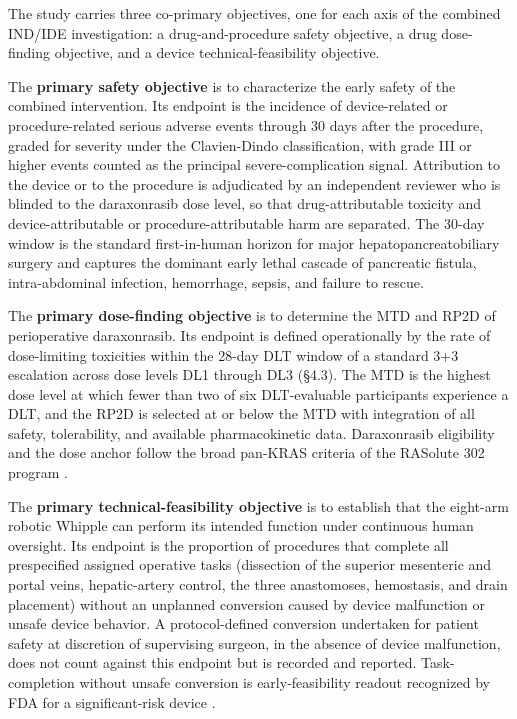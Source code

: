 The study carries three co-primary objectives, one for each axis of the combined
IND/IDE investigation: a drug-and-procedure safety objective, a drug dose-finding
objective, and a device technical-feasibility objective.

The \textbf{primary safety objective} is to characterize the early safety of the
combined intervention. Its endpoint is the incidence of device-related or
procedure-related serious adverse events through 30 days after the procedure,
graded for severity under the Clavien-Dindo classification, with grade III or
higher events counted as the principal severe-complication signal. Attribution to
the device or to the procedure is adjudicated by an independent reviewer who is
blinded to the daraxonrasib dose level, so that drug-attributable toxicity and
device-attributable or procedure-attributable harm are separated. The 30-day
window is the standard first-in-human horizon for major hepatopancreatobiliary
surgery and captures the dominant early lethal cascade of pancreatic fistula,
intra-abdominal infection, hemorrhage, sepsis, and failure to rescue.

The \textbf{primary dose-finding objective} is to determine the MTD and RP2D of
perioperative daraxonrasib. Its endpoint is defined operationally by the rate of
dose-limiting toxicities within the 28-day DLT window of a standard 3+3
escalation across dose levels DL1 through DL3 (\S4.3). The MTD is the highest
dose level at which fewer than two of six DLT-evaluable participants experience a
DLT, and the RP2D is selected at or below the MTD with integration of all safety,
tolerability, and available pharmacokinetic data. Daraxonrasib eligibility and
the dose anchor follow the broad pan-KRAS criteria of the RASolute 302 program
\cite{rasolute302}.

The \textbf{primary technical-feasibility objective} is to establish that the
eight-arm robotic Whipple can perform its intended function under continuous human
oversight. Its endpoint is the proportion of procedures that complete all
prespecified assigned operative tasks (dissection of the superior mesenteric and
portal veins, hepatic-artery control, the three anastomoses, hemostasis, and
drain placement) without an unplanned conversion caused by device malfunction or
unsafe device behavior. A protocol-defined conversion undertaken for patient
safety at discretion of supervising surgeon, in the absence of device
malfunction, does not count against this endpoint but is recorded and reported.
Task-completion without unsafe conversion is early-feasibility readout
recognized by FDA for a significant-risk device \cite{fda2013earlyfeasibility}.

